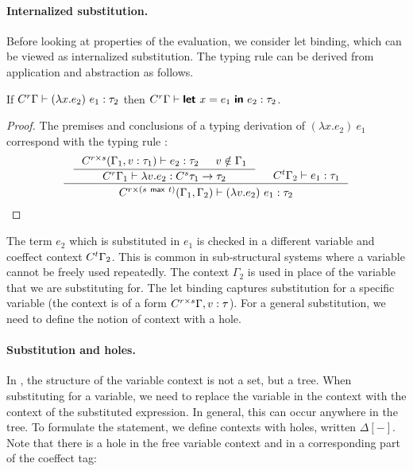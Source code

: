 \paragraph{Internalized substitution.}
Before looking at properties of the evaluation, we consider let binding, which can be 
viewed as internalized substitution. The typing rule  can be derived from 
application and abstraction as follows. 

\begin{lemma}
If $C^{r}\Gamma \vdash (\lambda x.e_2)~e_1 : \tau_2$
then $\ctyp{r}{\Gamma} \vdash \kvd{let}~x=e_1~\kvd{in}~e_2 : \tau_2$.
\end{lemma}
\begin{proof}
The premises and conclusions of a typing derivation of $(\lambda x.e_2)~e_1$
correspond with the typing rule :
\begin{equation*}
\inference[]
  {\inference
    {\ctyp{r \cprd s}{(\Gamma_1, v:\tau_1)} \vdash e_2 : \tau_2 & v \notin \Gamma_1}
    {\ctyp{r}{\Gamma_1} \vdash \lambda v.e_2 : \ctyp{s}{\tau_1} \rightarrow \tau_2 } &
   \ctyp{t}{\Gamma_2} \vdash e_1 : \tau_1 }
  {\ctyp{r \cprd (s \cvop t)}{(\Gamma_1, \Gamma_2)} \vdash (\lambda v.e_2)~e_1 : \tau_2}\qedhere
\end{equation*}
\end{proof}

The term $e_2$ which is substituted in $e_1$ is checked in a different variable
and coeffect context $C^{t}\Gamma_2$. This is common in sub-structural systems where
a variable cannot be freely used repeatedly. The context $\Gamma_2$ is used in place of 
the variable that we are substituting for. The let binding captures substitution for a 
specific variable (the context is of a form $C^{r \times s}\Gamma, v:\tau$).
For a general substitution, we need to define the notion of context with a hole.

\newcommand{\chole}[4]{\ctyp{#1}{#2}[#3|#4]}
\paragraph{Substitution and holes.}
In \clstr, the structure of the variable context is not a set, but a tree. When substituting
for a variable, we need to replace the variable in the context with the context of the
substituted expression. In general, this can occur anywhere in the tree. To formulate the
statement, we define contexts with holes, written $\Delta[-]$. Note that there is a hole
in the free variable context and in a corresponding part of the coeffect tag:

